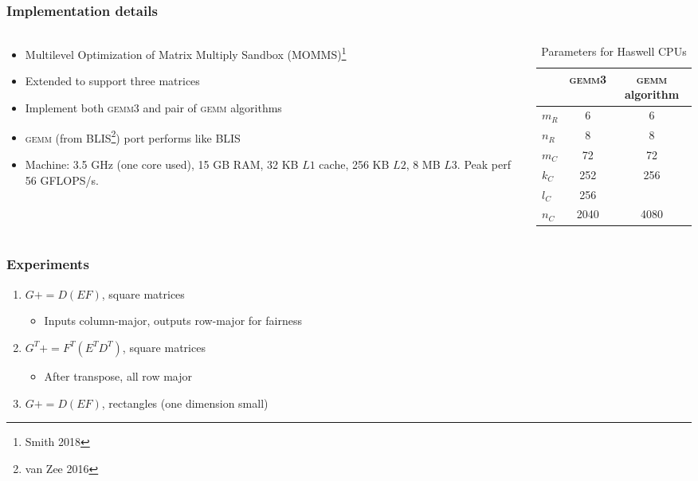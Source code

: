 \documentclass{beamer}
\newcommand*{\pluseq}{\mathrel{{+}{=}}}
\newcommand*{\gemmt}{{\textsc{gemm3}}}
\newcommand*{\gemm}{{\textsc{gemm}}}
\begin{document}
\begin{frame}
  \frametitle{Implementation details}
  \begin{columns}
    \begin{column}{0.55\textwidth}
      \begin{itemize}
      \item Multilevel Optimization of Matrix Multiply Sandbox (MOMMS)\footnote[frame]{Smith 2018}
      \item Extended to support three matrices
      \item Implement both \gemmt{} and pair of \gemm{} algorithms
      \item \gemm{} (from BLIS\footnote[frame]{van Zee 2016}) port performs like BLIS
      \item Machine: 3.5 GHz (one core used), 15 GB RAM, 32 KB $L1$ cache, 256 KB $L2$, 8 MB $L3$. Peak perf 56 GFLOPS/s.
      \end{itemize}
    \end{column}
    \begin{column}{0.45\textwidth}
      \begin{table}
        \centering
        \begin{tabular}{l|c c}
          &\gemmt{}&\gemm{} algorithm\\ \hline
          $m_R$&6&6\\
          $n_R$&8&8\\
          $m_C$&72&72\\
          $k_C$&252&256\\
          $l_C$&256&\\
          $n_C$&2040&4080\\
        \end{tabular}
        \caption{Parameters for Haswell CPUs}
        \label{tab:haswell-paramss}
      \end{table}
    \end{column}
  \end{columns}
\end{frame}

\begin{frame}
  \frametitle{Experiments}
  \begin{enumerate}
  \item $G \pluseq D(EF)$, square matrices
    \begin{itemize}
    \item Inputs column-major, outputs row-major for fairness
    \end{itemize}
  \item $G^T \pluseq F^T(E^TD^T)$, square matrices
    \begin{itemize}
    \item After transpose, all row major
    \end{itemize}
  \item $G \pluseq D(EF)$, rectangles (one dimension small)
  \end{enumerate}
\end{frame}
\end{document}
